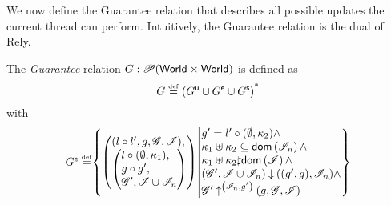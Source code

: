 We now define the Guarantee relation  that describes all possible updates the current thread can perform. Intuitively, the Guarantee relation is the dual of Rely.
%
\begin{definition}[Guarantee]
The \emph{Guarantee} relation $G: \mathscr{P} (\textsf{World} \times \textsf{World})$ is defined as
%
\[
	G \mathrel{\stackrel{\smash{\scriptscriptstyle{\mathrm{def}}}}{=}}  \left( G^{\textsf{u}} \cup G^{\textsf{e}} \cup G^{\textsf{s}} \right)^{\text{*}}
\]
%
with
%
\[
\begin{array}{@{} r @{} l @{}}

	\extendG \eqdef &
 	\left\{
	\begin{array}{@{} l @{\hspace*{2pt}} | @{\hspace*{2pt}} r @{}}
	   \left(
	   \begin{array}{@{} l @{}}
	     (l \composeL l', g, \gmod, \lmod),\\
 	     \left(
	     \begin{array}{@{} l @{}}
	      l \composeL (\unitH, \ca{1}),\\
	      g \composeL g',\\
	      \gmod', \lmod \cup \lmod_n
	     \end{array}
 	    \right)
	   \end{array}
 	  \right)
	   &
 	  	\begin{array}{@{} l @{}}
	 	  	g' = l' \composeL (\unitH, \ca{2})  \land\\
	 	  	
	 	  	\ca{1} \composeCap \ca{2} \subseteq \dom{\lmod_n} \land \\
	 	  	
	 	  	\ca{1} \composeCap \ca{2} \disjoint \dom{\lmod} \land \\
	 	  	
			\extendsAM{\gmod', \lmod \cup \lmod_n}{g'}{g}{\lmod_n} \land \\
			

			\expandsAM{\gmod'}{\lmod_n}{g'}{g}{\gmod}{\lmod}
			
     	
   		\end{array}
 	\end{array}
	\right\}\\
	

\end{array}\]
\end{definition}
